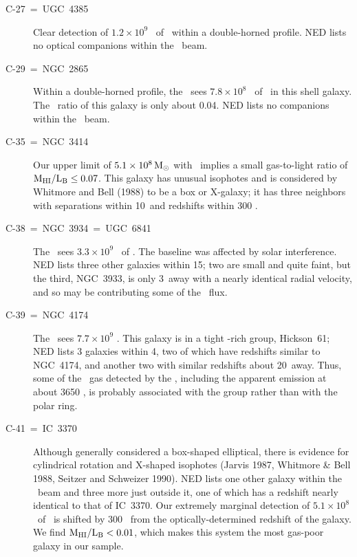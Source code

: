 \begin{description}
\item[C-27~=~UGC~4385] 
Clear detection of $1.2 \times 10^9$ \MSUN\ of \HI\ within a double-horned 
profile.  NED lists no optical companions within the \ beam.  

\item[C-29~=~NGC~2865] 
Within a double-horned profile, 
the \ sees $7.8 \times 10^8$ \MSUN\ of \HI\ in this shell galaxy.  
The \MHILB\ ratio of this galaxy is only about 0.04.  
NED lists no companions within the \ beam. 

\item[C-35~=~NGC~3414] 
Our upper limit of $5.1 \times 10^8 {\,{\rm M}_\odot}$ with \  
implies a small gas-to-light ratio of $\rm M_{\rm HI}/L_{\rm B} 
\leq 0.07$.  This galaxy has unusual isophotes and is considered by 
Whitmore and Bell (1988) to be a box or X-galaxy; it has three  
neighbors with separations within 10\AMIN\ and redshifts within 300 \KMS.    

\item[C-38~=~NGC~3934~=~UGC~6841] 
The \ sees $3.3\times 10^9$ \MSUN\ of \HI.  
The baseline was affected by solar interference.  NED lists three other 
galaxies within 15\AMIN; two are small and quite faint, but the third, 
NGC~3933, is only 3\AMIN\ away with a nearly identical radial velocity, 
and so may be contributing some of the \ flux.  

\item[C-39~=~NGC~4174] 
The \GB140\ sees $7.7 \times 10^9$ \MSUN.  
This galaxy is in a tight \HI-rich group, Hickson~61;
NED lists 3 galaxies within 4\AMIN, two of which 
have redshifts similar to NGC~4174, and another two  with 
similar redshifts about 20\AMIN\ away.  Thus, some of the \HI\ gas 
detected by the \GB140, including the apparent emission at about 3650 \KMS, 
is probably associated with the group rather than with the polar ring.

\item[C-41~=~IC~3370] 
Although generally considered a box-shaped elliptical, there is 
evidence for cylindrical rotation and X-shaped isophotes (Jarvis 1987, 
Whitmore \& Bell 1988, Seitzer and Schweizer 1990).  
NED lists one other galaxy within the \ beam and three more just 
outside it, one of which has a redshift nearly identical to that of IC~3370.
Our extremely marginal detection of $5.1 \times 10^8$ \MSUN\ of \HI\ 
is shifted by 300 \KMS\ from the optically-determined redshift of the galaxy. 
We find $\rm M_{\rm HI}/L_{\rm B} < 0.01$, which  
makes this system the most gas-poor galaxy in our sample.  


\end{description}
